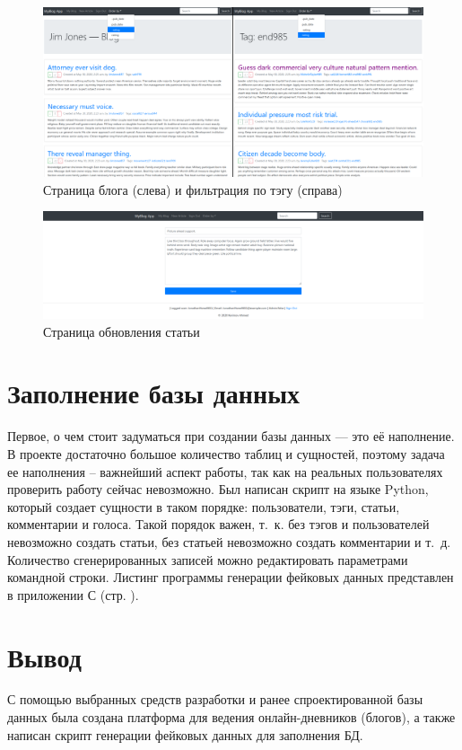 \begin{figure}[H]
	\centering
	\includegraphics[width=\linewidth]{inc/img/runtime-blog-tag}
	\caption{Страница блога (слева) и фильтрация по тэгу (справа)}
	\label{img:runtime-blog-tag}
\end{figure}

\begin{figure}[H]
	\centering
	\includegraphics[width=\linewidth]{inc/img/runtime-article-update}
	\caption{Страница обновления статьи}
	\label{img:runtime-article-update}
\end{figure}

\section{Заполнение базы данных}

Первое, о чем стоит задуматься при создании базы данных — это её наполнение.
В проекте достаточно большое количество таблиц и сущностей, поэтому задача ее наполнения – важнейший аспект работы, так как на реальных пользователях проверить работу сейчас невозможно.
Был написан скрипт на языке Python, который создает сущности в таком порядке: пользователи, тэги, статьи, комментарии и голоса.
Такой порядок важен, т.~к. без тэгов и пользователей невозможно создать статьи, без статьей невозможно создать комментарии и т.~д.
Количество сгенерированных записей можно редактировать параметрами командной строки.
Листинг программы генерации фейковых данных представлен в приложении С (стр. \pageref{chp:attachment-d}).

\section*{Вывод}

С помощью выбранных средств разработки и ранее спроектированной базы данных была создана платформа для ведения онлайн-дневников (блогов), а также написан скрипт генерации фейковых данных для заполнения БД.

